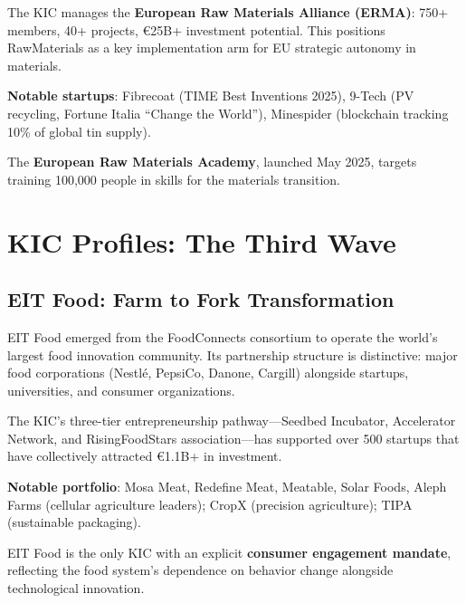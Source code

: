 \documentclass[../main.tex]{subfiles}
\begin{document}
The KIC manages the \textbf{European Raw Materials Alliance (ERMA)}: 750+ members, 40+ projects, €25B+ investment potential. This positions RawMaterials as a key implementation arm for EU strategic autonomy in materials.

\textbf{Notable startups}: Fibrecoat (TIME Best Inventions 2025), 9-Tech (PV recycling, Fortune Italia ``Change the World''), Minespider (blockchain tracking 10\% of global tin supply).

The \textbf{European Raw Materials Academy}, launched May 2025, targets training 100,000 people in skills for the materials transition.


\section*{KIC Profiles: The Third Wave}

\subsection*{EIT Food: Farm to Fork Transformation}

EIT Food emerged from the FoodConnects consortium to operate the world's largest food innovation community. Its partnership structure is distinctive: major food corporations (Nestlé, PepsiCo, Danone, Cargill) alongside startups, universities, and consumer organizations.

The KIC's three-tier entrepreneurship pathway---Seedbed Incubator, Accelerator Network, and RisingFoodStars association---has supported over 500 startups that have collectively attracted €1.1B+ in investment.

\textbf{Notable portfolio}: Mosa Meat, Redefine Meat, Meatable, Solar Foods, Aleph Farms (cellular agriculture leaders); CropX (precision agriculture); TIPA (sustainable packaging).

EIT Food is the only KIC with an explicit \textbf{consumer engagement mandate}, reflecting the food system's dependence on behavior change alongside technological innovation.
\end{document}
